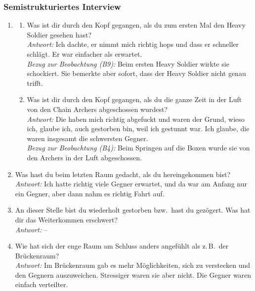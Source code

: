 \documentclass[../Main.tex]{subfiles}
\begin{document}
\subsubsection{Semistrukturiertes Interview}

\begin{enumerate}[label=\textbf{I\arabic*}, leftmargin=1.5cm, itemsep=1em]
    \item
    \begin{enumerate}[label=\alph*), itemsep=0.6em]
        \item Was ist dir durch den Kopf gegangen, als du zum ersten Mal den Heavy Soldier gesehen hast? \\
            \textit{Antwort:} Ich dachte, er nimmt mich richtig hops und dass er schneller schlägt. Er war einfacher als erwartet. \\
            \textit{Bezug zur Beobachtung (B9):} Beim ersten Heavy Soldier wirkte sie schockiert. Sie bemerkte aber sofort, dass der Heavy Soldier nicht genau trifft.
        \item Was ist dir durch den Kopf gegangen, als du die ganze Zeit in der Luft von den Chain Archers abgeschossen wurdest? \\
            \textit{Antwort:} Die haben mich richtig abgefuckt und waren der Grund, wieso ich, glaube ich, auch gestorben bin, weil ich gestunnt war. Ich glaube, die waren insgesamt die schwersten Gegner. \\
            \textit{Bezug zur Beobachtung (B4):} Beim Springen auf die Boxen wurde sie von den Archers in der Luft abgeschossen.
    \end{enumerate}

\item Was hast du beim letzten Raum gedacht, als du hereingekommen bist? \\
    \textit{Antwort:} Ich hatte richtig viele Gegner erwartet, und da war am Anfang nur ein Gegner, aber dann nahm es richtig Fahrt auf.

\item An dieser Stelle bist du wiederholt gestorben bzw.\ hast du gezögert. Was hat dir das Weiterkommen erschwert? \\
    \textit{Antwort:} --

\item Wie hat sich der enge Raum am Schluss anders angefühlt als z.\,B.\ der Brückenraum? \\
    \textit{Antwort:} Im Brückenraum gab es mehr Möglichkeiten, sich zu verstecken und den Gegnern auszuweichen. Stressiger waren sie aber nicht. Die Gegner waren einfach verteilter.


\end{enumerate}
\end{document}
